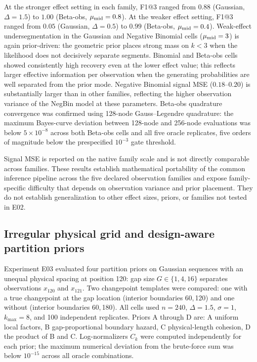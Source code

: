 At the stronger effect setting in each family, F1@3 ranged from $0.88$ (Gaussian, $\Delta=1.5$) to $1.00$ (Beta-obs, $\mu_{\rm mid}=0.8$). At the weaker effect setting, F1@3 ranged from $0.05$ (Gaussian, $\Delta=0.5$) to $0.99$ (Beta-obs, $\mu_{\rm mid}=0.4$). Weak-effect undersegmentation in the Gaussian and Negative Binomial cells ($\mu_{\rm mid}=3$) is again prior-driven: the geometric prior places strong mass on $k<3$ when the likelihood does not decisively separate segments. Binomial and Beta-obs cells showed consistently high recovery even at the lower effect value; this reflects larger effective information per observation when the generating probabilities are well separated from the prior mode. Negative Binomial signal MSE ($0.18$--$0.20$) is substantially larger than in other families, reflecting the higher observation variance of the NegBin model at these parameters. Beta-obs quadrature convergence was confirmed using 128-node Gauss--Legendre quadrature: the maximum Bayes-curve deviation between 128-node and 256-node evaluations was below $5\times10^{-8}$ across both Beta-obs cells and all five oracle replicates, five orders of magnitude below the prespecified $10^{-3}$ gate threshold.





Signal MSE is reported on the native family scale and is not directly comparable across families. These results establish mathematical portability of the common inference pipeline across the five declared observation families and expose family-specific difficulty that depends on observation variance and prior placement. They do not establish generalization to other effect sizes, priors, or families not tested in E02.

\FloatBarrier
\subsection{Irregular physical grid and design-aware partition priors}
Experiment E03 evaluated four partition priors on Gaussian sequences with an unequal physical spacing at position 120: gap size $G\in\{1,4,16\}$ separates observations $x_{120}$ and $x_{121}$. Two changepoint templates were compared: one with a true changepoint at the gap location (interior boundaries 60,\,120) and one without (interior boundaries 60,\,180). All cells used $n=240$, $\Delta=1.5$, $\sigma=1$, $k_{\max}=8$, and 100 independent replicates. Priors A through D are: A uniform local factors, B gap-proportional boundary hazard, C physical-length cohesion, D the product of B and C. Log-normalizers $C_k$ were computed independently for each prior; the maximum numerical deviation from the brute-force sum was below $10^{-15}$ across all oracle combinations.

